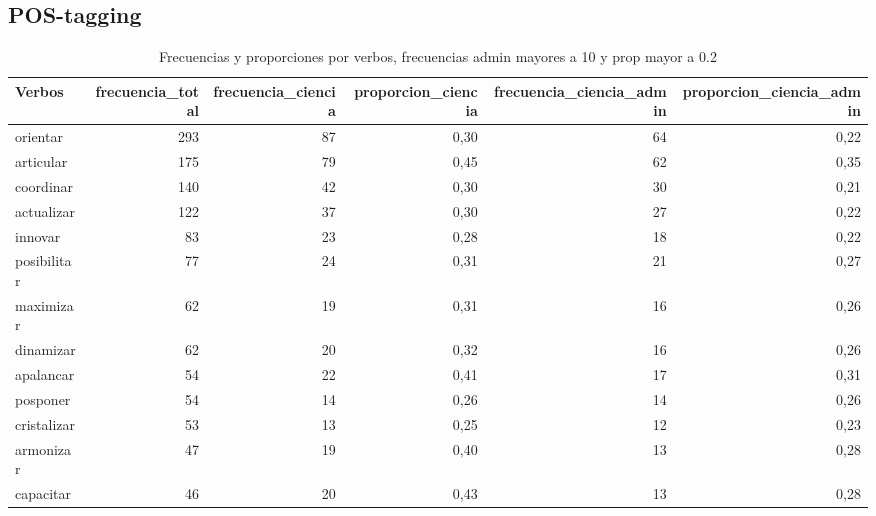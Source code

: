 \documentclass[11pt,                                                            
 superscriptaddress,twoside,
 amsmath,amssymb,
 aps, physrev
]{revtex4-2}
\begin{document}
\subsection{POS-tagging}

\begin{table}[H]
	\centering
	\begin{tabular}{lrrrrr}
		\hline
		Verbos & frecuencia\_total & frecuencia\_ciencia & proporcion\_ciencia & frecuencia\_ciencia\_admin & proporcion\_ciencia\_admin \\
		\hline
		orientar     & 293 & 87 & 0,30 & 64 & 0,22 \\
		articular    & 175 & 79 & 0,45 & 62 & 0,35 \\
		coordinar    & 140 & 42 & 0,30 & 30 & 0,21 \\
		actualizar   & 122 & 37 & 0,30 & 27 & 0,22 \\
		innovar      & 83  & 23 & 0,28 & 18 & 0,22 \\
		posibilitar  & 77  & 24 & 0,31 & 21 & 0,27 \\
		maximizar    & 62  & 19 & 0,31 & 16 & 0,26 \\
		dinamizar    & 62  & 20 & 0,32 & 16 & 0,26 \\
		apalancar    & 54  & 22 & 0,41 & 17 & 0,31 \\
		posponer     & 54  & 14 & 0,26 & 14 & 0,26 \\
		cristalizar  & 53  & 13 & 0,25 & 12 & 0,23 \\
		armonizar    & 47  & 19 & 0,40 & 13 & 0,28 \\
		capacitar    & 46  & 20 & 0,43 & 13 & 0,28 \\
		\hline
	\end{tabular}
	\caption{Frecuencias y proporciones por verbos, frecuencias admin mayores a 10 y prop mayor a 0.2}
\end{table}
\end{document}
